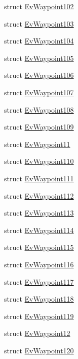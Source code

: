 \begin{DoxyCompactItemize}
struct \hyperlink{structcl__move__base__z_1_1EvWaypoint102}{Ev\+Waypoint102}
\item 
struct \hyperlink{structcl__move__base__z_1_1EvWaypoint103}{Ev\+Waypoint103}
\item 
struct \hyperlink{structcl__move__base__z_1_1EvWaypoint104}{Ev\+Waypoint104}
\item 
struct \hyperlink{structcl__move__base__z_1_1EvWaypoint105}{Ev\+Waypoint105}
\item 
struct \hyperlink{structcl__move__base__z_1_1EvWaypoint106}{Ev\+Waypoint106}
\item 
struct \hyperlink{structcl__move__base__z_1_1EvWaypoint107}{Ev\+Waypoint107}
\item 
struct \hyperlink{structcl__move__base__z_1_1EvWaypoint108}{Ev\+Waypoint108}
\item 
struct \hyperlink{structcl__move__base__z_1_1EvWaypoint109}{Ev\+Waypoint109}
\item 
struct \hyperlink{structcl__move__base__z_1_1EvWaypoint11}{Ev\+Waypoint11}
\item 
struct \hyperlink{structcl__move__base__z_1_1EvWaypoint110}{Ev\+Waypoint110}
\item 
struct \hyperlink{structcl__move__base__z_1_1EvWaypoint111}{Ev\+Waypoint111}
\item 
struct \hyperlink{structcl__move__base__z_1_1EvWaypoint112}{Ev\+Waypoint112}
\item 
struct \hyperlink{structcl__move__base__z_1_1EvWaypoint113}{Ev\+Waypoint113}
\item 
struct \hyperlink{structcl__move__base__z_1_1EvWaypoint114}{Ev\+Waypoint114}
\item 
struct \hyperlink{structcl__move__base__z_1_1EvWaypoint115}{Ev\+Waypoint115}
\item 
struct \hyperlink{structcl__move__base__z_1_1EvWaypoint116}{Ev\+Waypoint116}
\item 
struct \hyperlink{structcl__move__base__z_1_1EvWaypoint117}{Ev\+Waypoint117}
\item 
struct \hyperlink{structcl__move__base__z_1_1EvWaypoint118}{Ev\+Waypoint118}
\item 
struct \hyperlink{structcl__move__base__z_1_1EvWaypoint119}{Ev\+Waypoint119}
\item 
struct \hyperlink{structcl__move__base__z_1_1EvWaypoint12}{Ev\+Waypoint12}
\item 
struct \hyperlink{structcl__move__base__z_1_1EvWaypoint120}{Ev\+Waypoint120}
\item 

\end{DoxyCompactItemize}

